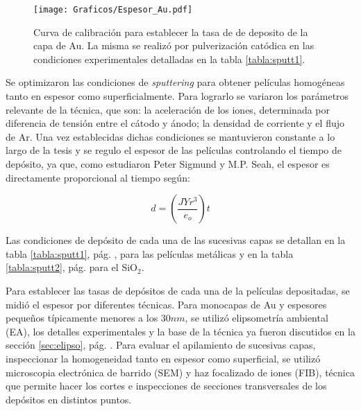 					   		\begin{figure}[ht!]
					   		\begin{center}
							\texttt{[image: Graficos/Espesor\_Au.pdf]}
							\caption[Curca de calibrado para el espesor de los electrodos]{Curva de calibración para establecer la tasa de de deposito de la capa de Au. La misma se realizó por pulverización catódica en las condiciones experimentales detalladas en la tabla \ref{tabla:sputt1}.}
							\label{fig:calibracionAu}
							\end{center}
							\end{figure}

		 Se optimizaron las condiciones de \textit{sputtering} para obtener películas homogéneas tanto en espesor como superficialmente. Para lograrlo se variaron los parámetros relevante de la técnica, que son: la aceleración de los iones, determinada por diferencia de tensión entre el cátodo y ánodo; la densidad de corriente y el flujo de Ar. Una vez establecidas dichas condiciones se mantuvieron constante a lo largo de la tesis y se regulo el espesor de las películas controlando el tiempo de depósito, ya que, como estudiaron Peter Sigmund\cite{sigmund1968} y M.P. Seah\cite{Seah2005}, el espesor es directamente proporcional al tiempo según:

	 			\begin{equation}
	 				d=\left(\frac{JYr^3}{e_o}\right)t
	 			\end{equation}


		 Las condiciones de depósito de cada una de las sucesivas capas se detallan en la tabla \ref{tabla:sputt1}, pág. \pageref{tabla:sputt1}, para las películas metálicas y en la tabla  \ref{tabla:sputt2}, pág. \pageref{tabla:sputt2} para el SiO$_2$. 

		 Para establecer las tasas de depósitos de cada una de la películas depositadas, se midió el espesor por diferentes técnicas. Para monocapas de Au y espesores pequeños típicamente menores a los $30nm$, se utilizó elipsometría ambiental (EA), los detalles experimentales y la base de la técnica ya fueron discutidos en la sección \ref{sec:elipso}, pág. \pageref{sec:elipso}. Para evaluar el apilamiento de sucesivas capas, inspeccionar la homogeneidad tanto en espesor como superficial, se utilizó microscopia electrónica de barrido (SEM) y haz focalizado de iones (FIB), técnica que permite hacer los cortes e inspecciones de secciones transversales de los depósitos en distintos puntos. 

